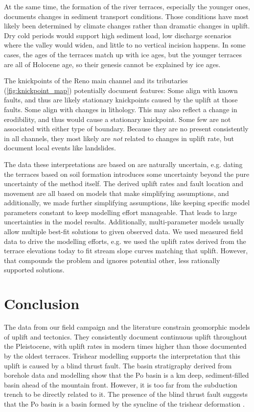 \documentclass[11pt]{article}
\begin{document}
At the same time, the formation of the river terraces, especially the younger ones, documents changes in sediment
transport conditions. Those conditions have most likely been determined by climate changes rather than dramatic 
changes in uplift. Dry cold periods would support high sediment load, low discharge scenarios where the valley
would widen, and little to no vertical incision happens. In some cases, the ages of the terraces match up with
ice ages, but the younger terraces are all of Holocene age, so their genesis cannot be explained by ice ages.

The knickpoints of the Reno main channel and its tributaries (\cref{fig:knickpoint_map}) potentially document
features:
Some align with known faults, and thus are likely stationary knickpoints caused by the uplift at those faults. 
Some align with changes in lithology. This may also reflect a change in erodibility, and thus would cause a
stationary knickpoint.
Some few are not associated with either type of boundary. Because they are no present consistently in all
channels, they most likely are \emph{not} related to changes in uplift rate, but document local events
like landslides.

The data these interpretations are based on are naturally uncertain, e.g. dating the terraces based on soil formation
introduces some uncertainty beyond the pure uncertainty of the method itself. The derived uplift rates and
fault location and movement are all based on models that make simplifying assumptions, and additionally, we made 
further simplifying assumptions, like keeping specific model parameters constant to keep modelling effort manageable.
That leads to large uncertainties in the model results. Additionally, multi-parameter models usually allow
multiple best-fit solutions to given observed data. We used measured field data to drive the modelling efforts, 
e.g. we used the uplift rates derived from the terrace elevations today to fit stream slope curves matching that uplift.
However, that compounds the problem and ignores potential other, less rationally supported solutions. 

\section{Conclusion}

The data from our field campaign and the literature constrain geomorphic models of uplift and tectonics.
They consistently document continuous uplift throughout the Pleistocene, with uplift rates 
in modern times higher than those documented by the oldest terraces. Trishear modelling supports the
interpretation that this uplift is caused by a blind thrust fault. 
The basin stratigraphy derived from borehole data and modelling show that the Po basin is a km deep, 
sediment-filled basin ahead of the mountain front.
However, it is too far from the subduction trench to be directly related to it. 
The presence of the blind thrust fault suggests that the Po basin is a basin formed by the syncline of the
trishear deformation \parencite{erslev_trishear_1991}.
\end{document}
